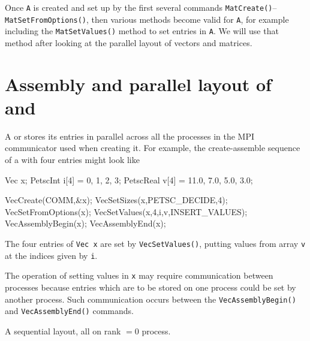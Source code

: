 Once \pMat \texttt{A} is created and set up by the first several commands \texttt{MatCreate()}--\texttt{MatSetFromOptions()}, then various methods become valid for \texttt{A}, for example including the \texttt{MatSetValues()} method to set entries in \texttt{A}.  We will use that method after looking at the parallel layout of vectors and matrices.


\section{Assembly and parallel layout of \pVecs and \pMats}

A \pVec or \pMat stores its entries in parallel across all the processes in the MPI communicator used when creating it.  For example, the create-assemble sequence of a \pVec with four entries might look like
\begin{code}
Vec x;
PetscInt   i[4] = {0, 1, 2, 3};
PetscReal  v[4] = {11.0, 7.0, 5.0, 3.0};

VecCreate(COMM,&x);
VecSetSizes(x,PETSC_DECIDE,4);
VecSetFromOptions(x);
VecSetValues(x,4,i,v,INSERT_VALUES);
VecAssemblyBegin(x);
VecAssemblyEnd(x);
\end{code}
The four entries of \texttt{Vec x} are set by \texttt{VecSetValues()}, putting values from array \texttt{v} at the indices given by \texttt{i}.

The operation of setting values in \texttt{x} may require communication between processes because entries which are to be stored on one process could be set by another process.  Such communication occurs between the \texttt{VecAssemblyBegin()} and \texttt{VecAssemblyEnd()} commands.

\begin{marginfigure}
\bigskip
\caption{A sequential \pVec layout, all on rank $=0$ process.}
\label{fig:seqveclayout}
\end{marginfigure}

